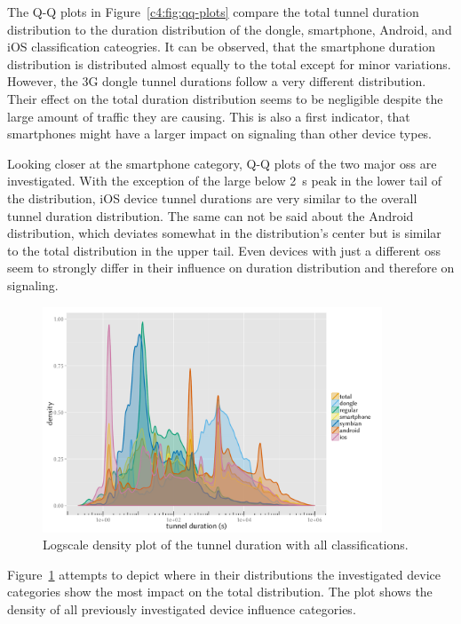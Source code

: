 The Q-Q plots in Figure~\ref{c4:fig:qq-plots} compare the total tunnel duration distribution to the duration distribution of the dongle, smartphone, Android, and iOS classification cateogries. It can be observed, that the smartphone duration distribution is distributed almost equally to the total except for minor variations. However, the \gls{3G} dongle tunnel durations follow a very different distribution. Their effect on the total duration distribution seems to be negligible despite the  large amount of traffic they are causing. This is also a first indicator, that smartphones might have a larger impact on signaling than other device types.

Looking closer at the smartphone category, Q-Q plots of the two major \glspl{os} are investigated. With the exception of the large below \SI{2}{\second} peak in the lower tail of the distribution, iOS device tunnel durations are very similar to the overall tunnel duration distribution. The same can not be said about the Android distribution, which deviates somewhat in the distribution's center but is similar to the total distribution in the upper tail. Even devices with just a different \glspl{os} seem to strongly differ in their influence on duration distribution and therefore on signaling.

\begin{figure}[htb]
	\centering
	\includegraphics[width=0.9\textwidth]{images/R-duration-classification-density.pdf}
	\caption{Logscale density plot of the tunnel duration with all classifications.}
\label{c4:fig:durations-density}
\end{figure}


Figure~\ref{c4:fig:durations-density} attempts to depict where in their distributions the investigated device categories show the most impact on the total distribution. The plot shows the density of all previously investigated device influence categories.

